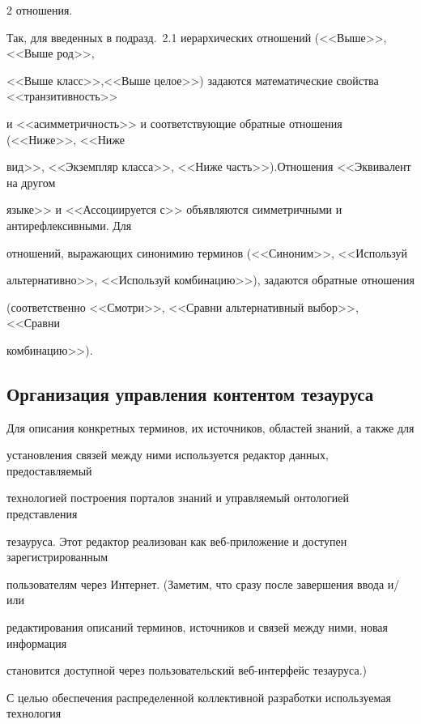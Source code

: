 \begin{multicols}{2}
отношения.

  

  Так, для введенных в подразд.~2.1 иерархических отношений (<<Выше>>, <<Выше род>>, 

<<Выше класс>>,\linebreak <<Выше целое>>) задаются математические  свойства <<транзитивность>> 

и <<асимметричность>> и соответствующие обратные отношения (<<Ниже>>, <<Ниже 

вид>>, <<Экземпляр класса>>, <<Ниже часть>>).\linebreak Отношения <<Эквивалент на другом 

языке>> и <<Ассоциируется с>> объявляются симметричными и антирефлексивными. Для 

отношений, выражающих синонимию терминов (<<Синоним>>, <<Используй\linebreak 

альтернативно>>, <<Используй комбинацию>>), задаются обратные отношения 

(соответственно <<Смот\-ри>>, <<Сравни альтернативный выбор>>, <<Сравни 

комбинацию>>).



\subsection{Организация управления контентом тезауруса}



  Для описания конкретных терминов, их источников, областей знаний, а также для 

установления связей между ними используется редактор данных, предоставляемый 

технологией построения порталов знаний и управляемый онтологией пред\-став\-ле\-ния 

тезауруса. Этот редактор реализован как веб-при\-ло\-же\-ние и доступен зарегистрированным 

пользователям через Интернет. (Заметим, что сразу после завершения ввода и/или 

редактирования описаний терминов, источников и связей между ними, новая информация 

становится доступной через пользовательский веб-интерфейс тезауруса.)

  

  С целью обеспечения распределенной коллективной разработки используемая технология 


\end{multicols}
